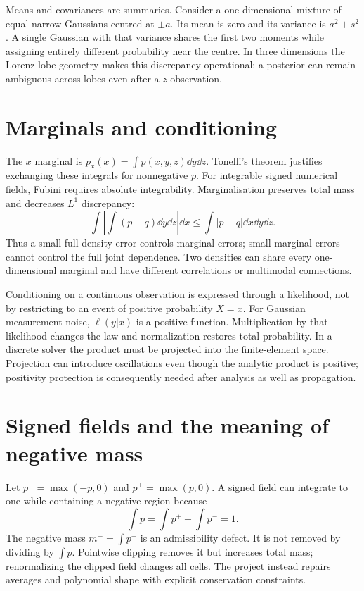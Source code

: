 Means and covariances are summaries. Consider a one-dimensional mixture of equal narrow Gaussians centred at $\pm a$. Its mean is zero and its variance is $a^2+s^2$. A single Gaussian with that variance shares the first two moments while assigning entirely different probability near the centre. In three dimensions the Lorenz lobe geometry makes this discrepancy operational: a posterior can remain ambiguous across lobes even after a $z$ observation.

\section{Marginals and conditioning}
The $x$ marginal is $p_x(x)=\int p(x,y,z)\dd y\dd z$. Tonelli's theorem justifies exchanging these integrals for nonnegative $p$. For integrable signed numerical fields, Fubini requires absolute integrability. Marginalisation preserves total mass and decreases $L^1$ discrepancy:
\begin{equation}\label{eq:marginal-contraction}
\int\left|\int(p-q)\dd y\dd z\right|\dd x\le\int|p-q|\dd x\dd y\dd z.
\end{equation}
Thus a small full-density error controls marginal errors; small marginal errors cannot control the full joint dependence. Two densities can share every one-dimensional marginal and have different correlations or multimodal connections.

Conditioning on a continuous observation is expressed through a likelihood, not by restricting to an event of positive probability $X=x$. For Gaussian measurement noise, $\ell(y|x)$ is a positive function. Multiplication by that likelihood changes the law and normalization restores total probability. In a discrete solver the product must be projected into the finite-element space. Projection can introduce oscillations even though the analytic product is positive; positivity protection is consequently needed after analysis as well as propagation.

\section{Signed fields and the meaning of negative mass}
Let $p^- =\max(-p,0)$ and $p^+=\max(p,0)$. A signed field can integrate to one while containing a negative region because
\begin{equation}
\int p=\int p^+-\int p^-=1.
\end{equation}
The negative mass $m^-=\int p^-$ is an admissibility defect. It is not removed by dividing by $\int p$. Pointwise clipping removes it but increases total mass; renormalizing the clipped field changes all cells. The project instead repairs averages and polynomial shape with explicit conservation constraints.

